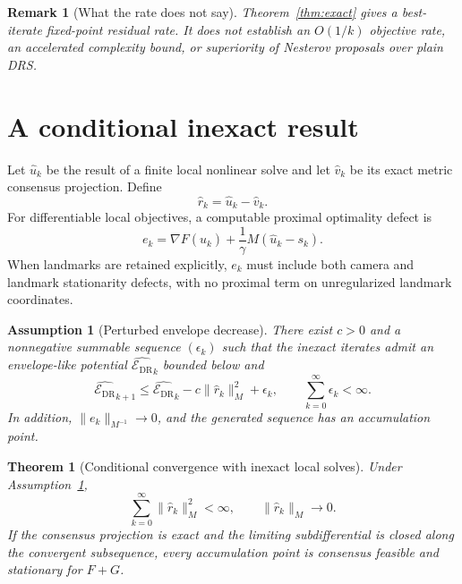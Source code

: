 \documentclass[11pt]{article}
\newtheorem{assumption}{Assumption}
\newtheorem{theorem}{Theorem}
\newtheorem{remark}{Remark}
\newcommand{\Edr}{\mathcal{E}_{\mathrm{DR}}}
\newcommand{\normM}[1]{\lVert #1\rVert_M}
\newcommand{\normMi}[1]{\lVert #1\rVert_{M^{-1}}}
\begin{document}
\begin{remark}[What the rate does not say]
Theorem~\ref{thm:exact} gives a best-iterate fixed-point residual rate.  It
does not establish an $O(1/k)$ objective rate, an accelerated complexity
bound, or superiority of Nesterov proposals over plain DRS.
\end{remark}

\section{A conditional inexact result}

Let $\widehat u_k$ be the result of a finite local nonlinear solve and let
$\widehat v_k$ be its exact metric consensus projection.  Define
\begin{equation}
  \widehat r_k=\widehat u_k-\widehat v_k.
\end{equation}
For differentiable local objectives, a computable proximal optimality defect
is
\begin{equation}
  e_k=\nabla F(\widehat u_k)
      +\frac{1}{\gamma}M(\widehat u_k-s_k).
  \label{eq:prox-defect}
\end{equation}
When landmarks are retained explicitly, $e_k$ must include both camera and
landmark stationarity defects, with no proximal term on unregularized
landmark coordinates.

\begin{assumption}[Perturbed envelope decrease]
\label{ass:inexact}
There exist $c>0$ and a nonnegative summable sequence $(\epsilon_k)$ such that
the inexact iterates admit an envelope-like potential $\widehat{\Edr}_k$
bounded below and
\begin{equation}
  \widehat{\Edr}_{k+1}
  \leq \widehat{\Edr}_k
  -c\normM{\widehat r_k}^2+\epsilon_k,
  \qquad
  \sum_{k=0}^{\infty}\epsilon_k<\infty.
  \label{eq:perturbed-descent}
\end{equation}
In addition, $\normMi{e_k}\to0$, and the generated sequence has an
accumulation point.
\end{assumption}

\begin{theorem}[Conditional convergence with inexact local solves]
\label{thm:inexact}
Under Assumption~\ref{ass:inexact},
\begin{equation}
  \sum_{k=0}^{\infty}\normM{\widehat r_k}^2<\infty,
  \qquad
  \normM{\widehat r_k}\to0.
\end{equation}
If the consensus projection is exact and the limiting subdifferential is
closed along the convergent subsequence, every accumulation point is
consensus feasible and stationary for $F+G$.
\end{theorem}
\end{document}
